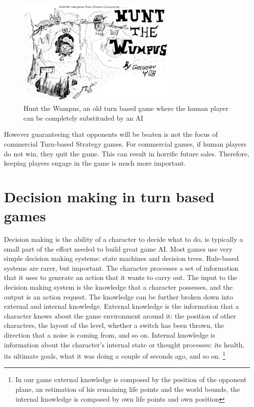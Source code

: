 \begin{figure}
  \centering
      \includegraphics[width=0.7\textwidth]{images/wumpus.png}
  \caption{Hunt the Wumpus, an old turn based game where the human player can be completely substituded by an AI}
\end{figure}

However guaranteeing that opponents will be beaten is not the focus of commercial Turn-based Strategy games. For commercial games, if human players do not win, they quit the game. This can result in horrific future sales. Therefore, keeping players engage in the game is much more important.

\section{Decision making in turn based games}

Decision making is the ability of a character to decide what to do, is typically a small part of the effort needed to build great game AI.
Most games use very simple decision making systems: state machines and decision trees.
Rule-based systems are rarer, but important.
The character processes a set of information that it uses to generate an action that it wants to carry out. The input to the decision making system is the knowledge that a character possesses, and the output is an action request. The knowledge can be further broken down into external and internal knowledge. External knowledge is the information that a character knows about the game environment around it: the position of other characters, the layout of the level, whether a switch has been thrown, the direction that a noise is coming from, and so on. Internal knowledge is information about the character's internal state or thought processes: its health, its ultimate goals, what it was doing a couple of seconds ago, and so on.
\footnote{In our game external knowledge is composed by the position of the opponent plane, an estimation of his remaining life points and the world bounds, the internal knowledge is composed by own life points and own position}

